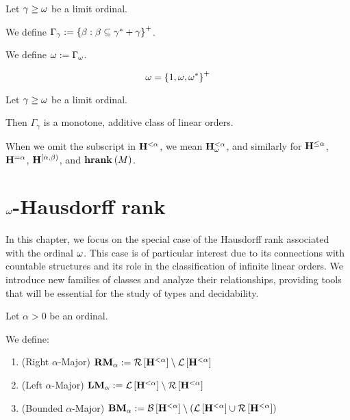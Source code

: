 \begin{definition}
  Let $\gamma \ge \omega$ be a limit ordinal.

  We define $\Gamma_{\gamma} := \left\{ {\beta : \beta \subseteq \gamma^\ast + \gamma} \right\}^+$.

  We define $\omega := \Gamma_{\omega}$.
\end{definition}

\begin{example}
  \[
    \omega = \left\{ {1, \omega, \omega^\ast} \right\}^+
  \]
\end{example}

\begin{observation}
  Let $\gamma \ge \omega$ be a limit ordinal.

  Then $\Gamma_{\gamma}$ is a monotone, additive class of linear orders.
\end{observation}


\begin{notation}
  When we omit the subscript in $\mathbf{H}_{}^{< \alpha}$,
  we mean $\mathbf{H}_{\omega}^{< \alpha}$,
  and similarly for $\mathbf{H}_{}^{\le \alpha}$, $\mathbf{H}_{}^{= \alpha}$, $\mathbf{H}_{}^{[\alpha, \beta)}$,
  and $\mathbf{hrank}_{} \left( {M} \right)$.
\end{notation}


\section{\texorpdfstring{$\omega$}{omega}-Hausdorff rank}

In this chapter, we focus on the special case of the Hausdorff rank associated with the ordinal $\omega$. This case is of particular interest due to its connections with countable structures and its role in the classification of infinite linear orders. We introduce new families of classes and analyze their relationships, providing tools that will be essential for the study of types and decidability.

\begin{definition}\label{bounded-definitions}
  Let $\alpha > 0$ be an ordinal.

  We define:
  \begin{enumerate}
    \item (Right $\alpha$-Major) $\mathbf{RM}_{\alpha} := \mathcal{R} \left[ {{\mathbf{H}_{}^{< \alpha}}} \right] \setminus \mathcal{L} \left[ {{\mathbf{H}_{}^{< \alpha}}} \right]$
    \item (Left $\alpha$-Major) $\mathbf{LM}_{\alpha} := \mathcal{L} \left[ {{\mathbf{H}_{}^{< \alpha}}} \right] \setminus \mathcal{R} \left[ {{\mathbf{H}_{}^{< \alpha}}} \right]$
    \item (Bounded $\alpha$-Major) $\mathbf{BM}_{\alpha} := \mathcal{B} \left[ {{\mathbf{H}_{}^{< \alpha}}} \right] \setminus \left( { \mathcal{L} \left[ {{\mathbf{H}_{}^{< \alpha}}} \right] \cup \mathcal{R} \left[ {{\mathbf{H}_{}^{< \alpha}}} \right] } \right)$
  \end{enumerate}
\end{definition}

